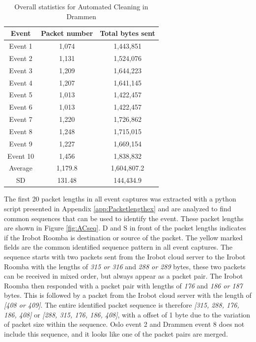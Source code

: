 \begin{table}[H]
\centering
\caption{Overall statistics for Automated Cleaning in Drammen}
\label{tab:ACoverallDRA}
\begin{tabular}{|c|c|c|}
\hline
\textbf{Event} & \textbf{Packet number} & \textbf{Total bytes sent} \\ \hline
Event 1        & 1,074                   & 1,443,851                   \\ \hline
Event 2        & 1,131                   & 1,524,076                   \\ \hline
Event 3        & 1,209                   & 1,644,223                   \\ \hline
Event 4        & 1,207                   & 1,641,145                   \\ \hline
Event 5        & 1,013                   & 1,422,457                   \\ \hline
Event 6        & 1,013                   & 1,422,457                   \\ \hline
Event 7        & 1,220                   & 1,726,862                   \\ \hline
Event 8        & 1,248                   & 1,715,015                   \\ \hline
Event 9        & 1,227                   & 1,669,154                   \\ \hline
Event 10       & 1,456                   & 1,838,832                   \\ \hline
Average        & 1,179.8                 & 1,604,807.2                 \\ \hline
SD        & 131.48
       & 144,434.9               \\ \hline
\end{tabular}
\end{table}

The first 20 packet lengths in all event captures was extracted with a python script presented in Appendix \ref{app:Packetlengthex} and are analyzed to find common sequences that can be used to identify the event. These packet lengths are shown in Figure \ref{fig:ACseq}. D and S in front of the packet lengths indicates if the Irobot Roomba is destination or source of the packet. The yellow marked fields are the common identified sequence pattern in all event captures. The sequence starts with two packets sent from the Irobot cloud server to the Irobot Roomba with the lengths of \textit{315 or 316} and \textit{288 or 289} bytes, these two packets can be received in mixed order, but always appear as a packet pair. The Irobot Roomba then responded with a packet pair with lengths of \textit{176} and \textit{186 or 187} bytes. This is followed by a packet from the Irobot cloud server with the length of \textit{[408 or 409]}. The entire identified packet sequence is therefore \textit{[315, 288, 176, 186, 408]} or \textit{[288, 315, 176, 186, 408]}, with a offset of 1 byte due to the variation of packet size within the sequence. Oslo event 2 and Drammen event 8 does not include this sequence, and it looks like one of the packet pairs are merged. 

